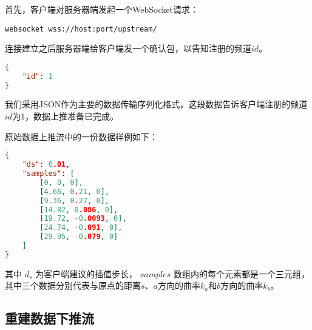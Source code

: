 首先，客户端对服务器端发起一个WebSocket请求：

\begin{lstlisting}
websocket wss://host:port/upstream/
\end{lstlisting}

连接建立之后服务器端给客户端发一个确认包，以告知注册的频道$id$。

\begin{lstlisting}[language=json,firstnumber=1]
{
    "id": 1
}
\end{lstlisting}

我们采用JSON作为主要的数据传输序列化格式，这段数据告诉客户端注册的频道$id$为$1$，数据上推准备已完成。

原始数据上推流中的一份数据样例如下：

\begin{lstlisting}[language=json,firstnumber=1]
{
    "ds": 0.01,
    "samples": [
        [0, 0, 0],
        [4.66, 0.21, 0],
        [9.36, 0.27, 0],
        [14.82, 0.086, 0],
        [19.72, -0.0093, 0],
        [24.74, -0.091, 0],
        [29.95, -0.079, 0]
    ]
}
\end{lstlisting}

其中 $d_s$ 为客户端建议的插值步长，
$samples$ 数组内的每个元素都是一个三元组，其中三个数据分别代表与原点的距离$s$、$a$方向的曲率$k_a$和$b$方向的曲率$k_b$。

\subsection{重建数据下推流}
